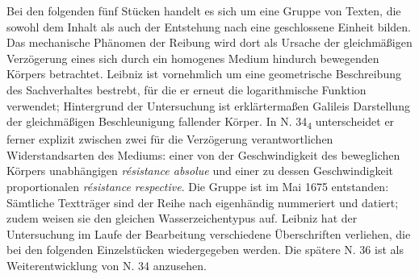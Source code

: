 \footnotesize 
\pstart
\noindent                
Bei den folgenden f\"{u}nf St\"{u}cken handelt es sich um eine Gruppe von Texten, die sowohl dem Inhalt als auch der Entstehung nach eine geschlossene Einheit bilden. Das mechanische Ph\"{a}nomen der Reibung wird dort als Ursache der gleichm\"{a}ßigen Verz\"{o}gerung eines sich durch ein homogenes Medium hindurch bewegenden K\"{o}rpers betrachtet. Leibniz ist vornehmlich um eine geometrische Beschreibung des Sachver\-haltes bestrebt, f\"{u}r die er erneut die logarithmische Funktion verwendet; Hintergrund der Untersuchung ist erkl\"{a}rtermaßen Galileis Darstellung der gleichm\"{a}ßigen Beschleunigung fallender K\"{o}rper. In N. 34\textsubscript{4} unterscheidet er ferner explizit zwischen zwei f\"{u}r die Verz\"{o}gerung verantwortlichen Widerstandsarten des Mediums: einer von der Geschwindigkeit des beweglichen K\"{o}rpers unabh\"{a}ngigen \textit{r\'{e}sistance absolue} und einer zu dessen Geschwindigkeit proportionalen \textit{r\'{e}sistance respective}. Die Gruppe ist im Mai 1675 entstanden: S\"{a}mtliche Texttr\"{a}ger sind der Reihe nach eigenh\"{a}ndig nummeriert und datiert; zudem weisen sie den gleichen Wasserzeichentypus auf. Leibniz hat der Untersuchung im Laufe der Bearbeitung verschiedene \"{U}berschriften verliehen, die bei den folgenden Einzelst\"{u}cken wiedergegeben werden. Die sp\"{a}tere N. 36 ist als Weiterentwicklung von N. 34 anzusehen.
\pend
\normalsize